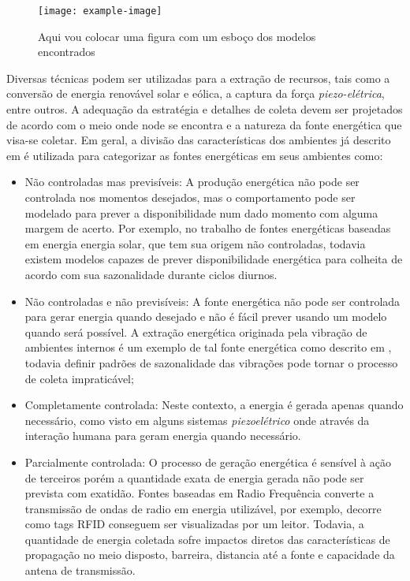 \begin{figure}[h]
\noindent\texttt{[image: example-image]} 
\caption{Aqui vou colocar uma figura com um esboço dos modelos encontrados}
\centering
\end{figure}

Diversas técnicas podem ser utilizadas para a extração de recursos, tais como a conversão de energia renovável solar e eólica, a captura da força \textit{piezo-elétrica}, entre outros. A adequação da estratégia e detalhes de coleta devem ser projetados de acordo com o meio onde node se encontra e a natureza da fonte energética que visa-se coletar. Em geral, a divisão das características dos ambientes já descrito em \cite{kansal_power_2007} é utilizada para categorizar as fontes energéticas em seus ambientes como:

\begin{itemize}

    \item Não controladas mas previsíveis: A produção energética não pode ser controlada nos momentos desejados, mas o comportamento pode ser modelado para prever a disponibilidade num dado momento com alguma margem de acerto. Por exemplo, no trabalho de  \cite{lee_energy_2018} fontes energéticas baseadas em energia energia solar, que tem sua origem não controladas, todavia existem modelos capazes de prever  disponibilidade energética para colheita de acordo com sua sazonalidade durante ciclos diurnos.
    
    \item Não controladas e não previsíveis: A fonte energética não pode ser controlada para gerar energia quando desejado e não é fácil prever usando um modelo quando será possível. A extração energética originada pela vibração de ambientes internos é um exemplo de tal fonte energética como descrito em \cite{wei_comprehensive_2017}, todavia definir padrões de sazonalidade das vibrações pode tornar o processo de coleta impraticável;
    
    \item Completamente controlada: Neste contexto, a energia é gerada apenas quando necessário, como visto em alguns sistemas \textit{piezoelétrico} onde através da interação humana para geram energia quando necessário.
    
    \item Parcialmente controlada: O processo de geração energética é sensível à ação de terceiros porém a quantidade exata de energia gerada não pode ser prevista com exatidão. Fontes baseadas em Radio Frequência converte a transmissão de ondas de radio em energia utilizável, por exemplo, \cite{shaikh_energy_2016} decorre como tags \acf{RFID} conseguem ser visualizadas por um leitor. Todavia, a quantidade de energia coletada sofre impactos diretos das características de propagação no meio disposto, barreira, distancia até a fonte e capacidade da antena de transmissão.
\end{itemize}

